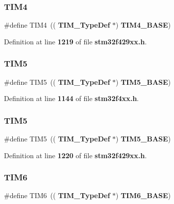 \subsubsection{T\+I\+M4\hspace{0.1cm}{\footnotesize\ttfamily [2/2]}}
{\footnotesize\ttfamily \#define T\+I\+M4~((\textbf{ T\+I\+M\+\_\+\+Type\+Def} $\ast$) \textbf{ T\+I\+M4\+\_\+\+B\+A\+SE})}



Definition at line \textbf{ 1219} of file \textbf{ stm32f429xx.\+h}.

\mbox{\label{group__Peripheral__declaration_ga5125ff6a23a2ed66e2e19bd196128c14}} 
\subsubsection{T\+I\+M5\hspace{0.1cm}{\footnotesize\ttfamily [1/2]}}
{\footnotesize\ttfamily \#define T\+I\+M5~((\textbf{ T\+I\+M\+\_\+\+Type\+Def} $\ast$) \textbf{ T\+I\+M5\+\_\+\+B\+A\+SE})}



Definition at line \textbf{ 1144} of file \textbf{ stm32f4xx.\+h}.

\mbox{\label{group__Peripheral__declaration_ga5125ff6a23a2ed66e2e19bd196128c14}} 
\subsubsection{T\+I\+M5\hspace{0.1cm}{\footnotesize\ttfamily [2/2]}}
{\footnotesize\ttfamily \#define T\+I\+M5~((\textbf{ T\+I\+M\+\_\+\+Type\+Def} $\ast$) \textbf{ T\+I\+M5\+\_\+\+B\+A\+SE})}



Definition at line \textbf{ 1220} of file \textbf{ stm32f429xx.\+h}.

\mbox{\label{group__Peripheral__declaration_gac7b4ed55f9201b498b38c962cca97314}} 
\subsubsection{T\+I\+M6\hspace{0.1cm}{\footnotesize\ttfamily [1/2]}}
{\footnotesize\ttfamily \#define T\+I\+M6~((\textbf{ T\+I\+M\+\_\+\+Type\+Def} $\ast$) \textbf{ T\+I\+M6\+\_\+\+B\+A\+SE})}



